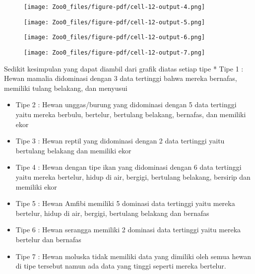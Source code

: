 \documentclass[
  letterpaper,
]{krantz}
\begin{document}
\begin{figure}[H]

{\centering \texttt{[image: Zoo0\_files/figure-pdf/cell-12-output-4.png]}

}

\end{figure}

\begin{figure}[H]

{\centering \texttt{[image: Zoo0\_files/figure-pdf/cell-12-output-5.png]}

}

\end{figure}

\begin{figure}[H]

{\centering \texttt{[image: Zoo0\_files/figure-pdf/cell-12-output-6.png]}

}

\end{figure}

\begin{figure}[H]

{\centering \texttt{[image: Zoo0\_files/figure-pdf/cell-12-output-7.png]}

}

\end{figure}

Sedikit kesimpulan yang dapat diambil dari grafik diatas setiap tipe *
Tipe 1 : Hewan mamalia didominasi dengan 3 data tertinggi bahwa mereka
bernafas, memiliki tulang belakang, dan menyusui

\begin{itemize}
\item
  Tipe 2 : Hewan unggas/burung yang didominasi dengan 5 data tertinggi
  yaitu mereka berbulu, bertelur, bertulang belakang, bernafas, dan
  memiliki ekor
\item
  Tipe 3 : Hewan reptil yang didominasi dengan 2 data tertinggi yaitu
  bertulang belakang dan memiliki ekor
\item
  Tipe 4 : Hewan dengan tipe ikan yang didominasi dengan 6 data
  tertinggi yaitu mereka bertelur, hidup di air, bergigi, bertulang
  belakang, bersirip dan memiliki ekor
\item
  Tipe 5 : Hewan Amfibi memiliki 5 dominasi data tertinggi yaitu mereka
  bertelur, hidup di air, bergigi, bertulang belakang dan bernafas
\item
  Tipe 6 : Hewan serangga memiliki 2 dominasi data tertinggi yaitu
  mereka bertelur dan bernafas
\item
  Tipe 7 : Hewan moluska tidak memiliki data yang dimiliki oleh semua
  hewan di tipe tersebut namun ada data yang tinggi seperti mereka
  bertelur.
\end{itemize}
\end{document}
